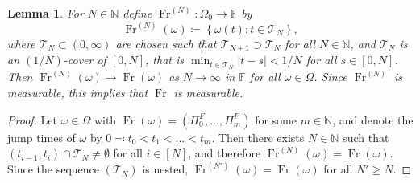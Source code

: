 \documentclass[reqno,draft]{amsart}
\numberwithin{equation}{section}
\theoremstyle{plain}
\newtheorem{lemma}[theorem]{Lemma}
\theoremstyle{remark}
\newcommand{\N}{\mathbb{N}} %
\newcommand{\fpart}{\Pi} %
\DeclareMathOperator{\fr}{Fr}
\begin{document}
%
\begin{lemma}\label{lem:frmeasurable}
    For $N \in \N$ define $\fr^{(N)}\colon \Omega_0 \to \mathbb{F}$ by \[
    \fr^{(N)} (\omega) \coloneqq \left\{ \omega(t) \colon t \in \mathcal{T}_N \right\} ,
\] where $\mathcal{T}_N \subset (0,\infty)$ are chosen such that $\mathcal{T}_{N+1} \supset \mathcal{T}_N$ for all $N\in \N$, and $\mathcal{T}_N$ is an $(1 / N)$-cover of $[0,N]$, that is $\min_{t\in \mathcal{T}_N} |t - s| < 1 / N $ for all $s \in [0,N]$.
Then $\fr^{(N)}(\omega) \to \fr(\omega)$ as $N\to \infty$ in $\mathbb{F}$ for all $\omega\in \Omega$. Since $\fr^{(N)}$ is measurable, this implies that $\fr$ is measurable.
\end{lemma}
\begin{proof}
    Let $\omega\in \Omega$ with $\fr(\omega) = (\fpart_0^F, \ldots ,\fpart_m^F)$ for some $m\in \N$, and denote the jump times of $\omega$ by $0 \eqqcolon t_0 < t_1 < \ldots < t_m$. Then there exists $N\in \N$ such that $(t_{i-1}, t_i) \cap \mathcal{T}_N \neq \emptyset$ for all $i \in [N]$, and therefore $\fr^{(N)}(\omega) = \fr(\omega)$. Since the sequence $(\mathcal{T}_N)$ is nested, $\fr^{(N')}(\omega) = \fr(\omega)$ for all $N' \ge N$.
\end{proof}
\end{document}
